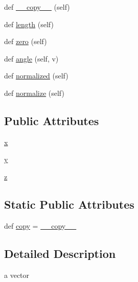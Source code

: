 \begin{DoxyCompactItemize}
\item 
def \mbox{\hyperlink{classpymavlink_1_1rotmat_1_1Vector3_acf9ffe33395785fa44d643dafeddca03}{\+\_\+\+\_\+copy\+\_\+\+\_\+}} (self)
\item 
def \mbox{\hyperlink{classpymavlink_1_1rotmat_1_1Vector3_a43dcff386a802ebcc77d224fc0078bb0}{length}} (self)
\item 
def \mbox{\hyperlink{classpymavlink_1_1rotmat_1_1Vector3_aa22093b2e0909ab64ef2f22ac305412e}{zero}} (self)
\item 
def \mbox{\hyperlink{classpymavlink_1_1rotmat_1_1Vector3_a6f26e26f6bbc45630fe618da692f5148}{angle}} (self, v)
\item 
def \mbox{\hyperlink{classpymavlink_1_1rotmat_1_1Vector3_aca80b86ab5912de572c2472d1ab59705}{normalized}} (self)
\item 
def \mbox{\hyperlink{classpymavlink_1_1rotmat_1_1Vector3_a4921c4f57ba345e4882fcfd2e2619a26}{normalize}} (self)
\end{DoxyCompactItemize}
\subsection*{Public Attributes}
\begin{DoxyCompactItemize}
\item 
\mbox{\hyperlink{classpymavlink_1_1rotmat_1_1Vector3_abf902e4255e330c7e89fee6dd9ba9e25}{x}}
\item 
\mbox{\hyperlink{classpymavlink_1_1rotmat_1_1Vector3_a60045ae80acd7753b9fb083e5bd200c5}{y}}
\item 
\mbox{\hyperlink{classpymavlink_1_1rotmat_1_1Vector3_a5552bcce4c8e91996e2b161166b3e30e}{z}}
\end{DoxyCompactItemize}
\subsection*{Static Public Attributes}
\begin{DoxyCompactItemize}
\item 
def \mbox{\hyperlink{classpymavlink_1_1rotmat_1_1Vector3_a794b0e2179cd60d153c016e4c3bca0ed}{copy}} = \mbox{\hyperlink{classpymavlink_1_1rotmat_1_1Vector3_acf9ffe33395785fa44d643dafeddca03}{\+\_\+\+\_\+copy\+\_\+\+\_\+}}
\end{DoxyCompactItemize}


\subsection{Detailed Description}
\begin{DoxyVerb}a vector\end{DoxyVerb}
 


